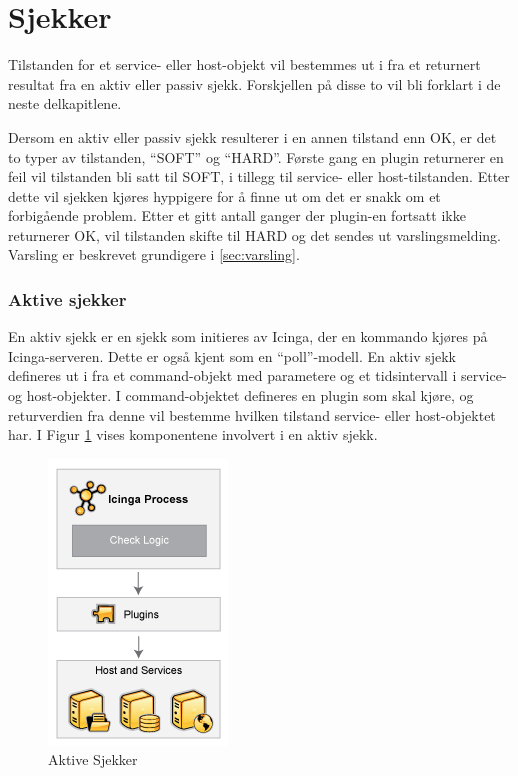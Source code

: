 \section{Sjekker}\label{sec:sjekker}
Tilstanden for et service- eller host-objekt vil bestemmes ut i fra et returnert resultat fra en aktiv eller passiv sjekk. Forskjellen på disse to vil bli forklart i de neste delkapitlene.

Dersom en aktiv eller passiv sjekk resulterer i en annen tilstand enn OK, er det to typer av tilstanden, ``SOFT'' og ``HARD''. Første gang en plugin returnerer en feil vil tilstanden bli satt til SOFT, i tillegg til service- eller host-tilstanden. Etter dette vil sjekken kjøres hyppigere for å finne ut om det er snakk om et forbigående problem. Etter et gitt antall ganger der plugin-en fortsatt ikke returnerer OK, vil tilstanden skifte til HARD og det sendes ut varslingsmelding. Varsling er beskrevet grundigere i \ref{sec:varsling}.

\subsubsection{Aktive sjekker}
En aktiv sjekk er en sjekk som initieres av Icinga, der en kommando kjøres på Icinga-serveren. Dette er også kjent som en ``poll''-modell. En aktiv sjekk defineres ut i fra et command-objekt med parametere og et tidsintervall i service- og host-objekter. I command-objektet defineres en plugin som skal kjøre, og returverdien fra denne vil bestemme hvilken tilstand service- eller host-objektet har. I Figur \ref{active_checks} vises komponentene involvert i en aktiv sjekk.
\begin{figure}
   \centering 
   \includegraphics[scale=0.7]{img/activechecks.png}
    \caption{Aktive Sjekker}
    \label{active_checks}
\end{figure}

